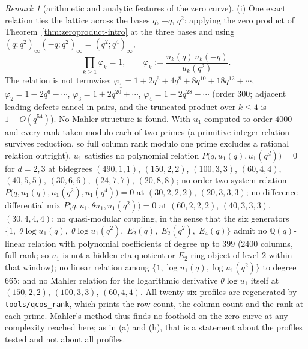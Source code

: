 \documentclass[11pt]{article}
\theoremstyle{plain}
\theoremstyle{definition}
\theoremstyle{remark}
\newtheorem{remark}[theorem]{Remark}
\newcommand{\Q}{\mathbb{Q}}
\begin{document}
\begin{remark}[arithmetic and analytic features of the zero curve]
(i) One exact relation ties the lattice across the bases $q$, $-q$, $q^2$: applying the zero
product of Theorem~\ref{thm:zeroproduct-intro} at the three bases and using
$(q;q^2)_\infty(-q;q^2)_\infty=(q^2;q^4)_\infty$,
\[
   \prod_{k\ge1}\varphi_k=1,\qquad
   \varphi_k:=\frac{u_k(q)\,u_k(-q)}{u_k(q^2)} .
\]
The relation is not termwise: $\varphi_1=1+2q^6+4q^8+8q^{10}+18q^{12}+\cdots$,
$\varphi_2=1-2q^6-\cdots$, $\varphi_3=1+2q^{20}+\cdots$, $\varphi_4=1-2q^{28}-\cdots$ (order
$300$; adjacent leading defects cancel in pairs, and the truncated product over $k\le4$ is
$1+O(q^{54})$). No Mahler structure is found. With $u_1$ computed to order $4000$ and every rank
taken modulo each of two primes (a primitive integer relation survives reduction, so full column
rank modulo one prime excludes a rational relation outright), $u_1$ satisfies no polynomial
relation $P\bigl(q,u_1(q),u_1(q^d)\bigr)=0$ for $d=2,3$ at bidegrees $(490,1,1)$, $(150,2,2)$,
$(100,3,3)$, $(60,4,4)$, $(40,5,5)$, $(30,6,6)$, $(24,7,7)$, $(20,8,8)$; no order-two system
relation $P\bigl(q,u_1(q),u_1(q^2),u_1(q^4)\bigr)=0$ at $(30,2,2,2)$, $(20,3,3,3)$; no
difference--differential mix $P\bigl(q,u_1,\theta u_1,u_1(q^2)\bigr)=0$ at $(60,2,2,2)$,
$(40,3,3,3)$, $(30,4,4,4)$; no quasi-modular coupling, in the sense that the six generators
$\{1,\;\theta\!\log u_1(q),\;\theta\!\log
u_1(q^2),\;E_2(q),\;E_2(q^2),\;E_4(q)\}$ admit no $\Q(q)$-linear relation with polynomial
coefficients of degree up to $399$ ($2400$ columns, full rank; so $u_1$ is not a hidden
eta-quotient or $E_2$-ring object of level $2$ within that window); no linear relation among
$\{1,\log u_1(q),\log u_1(q^2)\}$ to degree $665$; and no Mahler relation for the logarithmic
derivative $\theta\!\log u_1$ itself at $(150,2,2)$, $(100,3,3)$, $(60,4,4)$. All twenty-six
profiles are regenerated by \texttt{tools/qcos\_rank}, which prints the row count, the column
count and the rank at each prime. Mahler's method thus finds no foothold on the zero curve at
any complexity reached here; as in (a) and (h), that is a statement about the profiles tested and
not about all profiles.


\end{remark}
\end{document}
